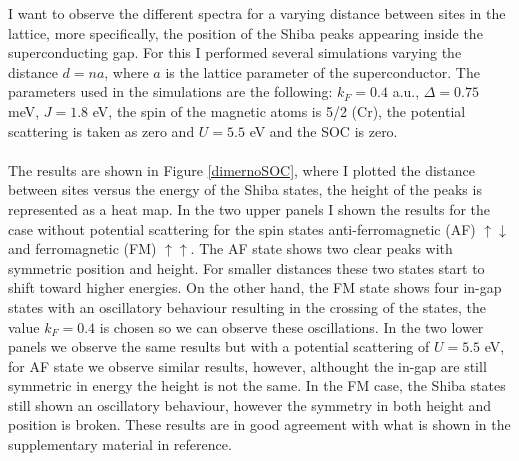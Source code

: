 \documentclass[letterpaper,12pt]{article}
\begin{document}
I want to observe the different spectra for a varying distance between sites in the lattice, more specifically, the position of the Shiba peaks appearing inside the superconducting gap. For this I performed several simulations varying the distance $d = na$, where $a$ is the lattice parameter of the superconductor. The parameters used in the simulations are the following: $k_F = 0.4$ a.u., $\Delta = 0.75$ meV, $J=1.8$ eV, the spin of the magnetic atoms is 5/2 (Cr), the potential scattering is taken as zero and $U = 5.5$ eV and the SOC is zero.\\ \\
The results are shown in Figure \ref{dimernoSOC}, where I plotted the distance between sites versus the energy of the Shiba states, the height of the peaks is represented as a heat map. In the two upper panels I shown the results for the case without potential scattering for the spin states anti-ferromagnetic (AF) $\uparrow\downarrow$ and ferromagnetic (FM) $\uparrow\uparrow$. The AF state shows two clear peaks with symmetric position and height. For smaller distances these two states start to shift toward higher energies. On the other hand, the FM state shows four in-gap states with an oscillatory behaviour resulting in the crossing of the states, the value $k_F = 0.4$ is chosen so we can observe these oscillations. In the two lower panels we observe the same results but with a potential scattering of $U = 5.5$ eV, for AF state we observe similar results, however, althought the in-gap are still symmetric in energy the height is not the same. In the FM case, the Shiba states still shown an oscillatory behaviour, however the symmetry in both height and position is broken. These results are in good agreement with what is shown in the supplementary material in reference\cite{DJ}.\\ \\ 
\end{document}
